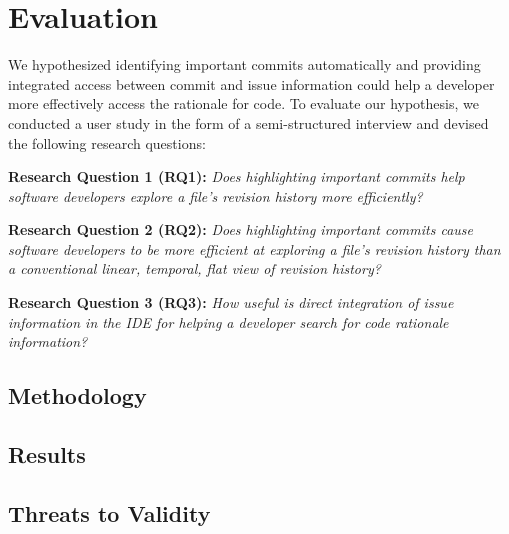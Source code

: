 \chapter{Evaluation}
\label{ch:Evaluation}

We hypothesized identifying important commits automatically and providing integrated access between commit and issue information could help a developer more effectively access the rationale for code.
To evaluate our hypothesis, we conducted a user study in the form of a semi-structured interview and devised the following research questions:

\textbf{Research Question 1 (RQ1):} \textit{Does highlighting important commits help software developers explore a file’s revision history more efficiently?}

\textbf{Research Question 2 (RQ2):} \textit{Does highlighting important commits cause software developers to be more efficient at exploring a file’s revision history than a conventional linear, temporal, flat view of revision history?}

\textbf{Research Question 3 (RQ3):} \textit{How useful is direct integration of issue information in the IDE for helping a developer search for code rationale information?}

\section{Methodology}
\label{sec:Methodology}

\section{Results}
\label{sec:Results}

\section{Threats to Validity}
\label{sec:Threads-to-Validity}

\endinput

Any text after an \endinput is ignored.
You could put scraps here or things in progress.